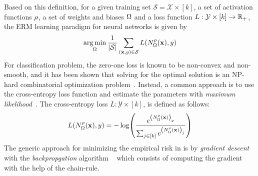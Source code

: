 \noindent
Based on this definition, for a given training set $\mathcal{S} = \mathcal{X} \times [k]$, a set of activation functions $\rho$, a set of weights and biases $\Omega$ and a loss function $L: \mathcal{Y} \times [k] \rightarrow \mathbb{R}_+$, the ERM learning paradigm for neural networks is given by
\begin{equation}
  \operatorname*{arg\,min}_{\Omega} \frac{1}{|\mathcal{S}|} \sum_{(\mathbf{x}, y) \in \mathcal{S}} L(N^\rho_\Omega(\mathbf{x}), y) 
  \label{equation:ch2-erm_neural_network}
\end{equation}
For classification problem, the zero-one loss is known to be non-convex and non-smooth, and it has been shown that solving for the optimal solution is an NP-hard combinatorial optimization problem~\cite{feldman2012agnostic,bendavid2003difficulty}.
Instead, a common approach is to use the cross-entropy loss function and estimate the parameters with \emph{maximum likelihood}~\cite{hastie2009elements}.
The cross-entropy loss $L:\mathcal{Y} \times [k]$, is defined as follows:
\begin{equation}
  L(N^\rho_\Omega(\xvec), y) = -\log
    \left(
      \frac
        {e^{\left(N^\rho_\Omega(\xvec)\right)_y}}
	{\sum_{j\in[k]} e^{\left(N^\rho_\Omega(\xvec)\right)_j}}
    \right)
\end{equation}
The generic approach for minimizing the empirical risk in  is by \emph{gradient descent} with the \emph{backpropgation} algorithm ~\cite{rumelhart1986learning} which consists of computing the gradient with the help of the chain-rule.






